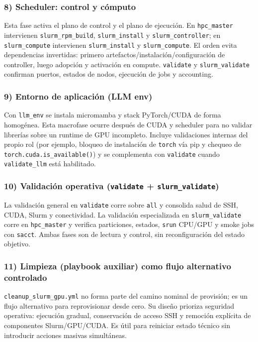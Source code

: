\subsubsection*{8) Scheduler: control y cómputo}
Esta fase activa el plano de control y el plano de ejecución. En \texttt{hpc\_master} intervienen \texttt{slurm\_rpm\_build}, \texttt{slurm\_install} y \texttt{slurm\_controller}; en \texttt{slurm\_compute} intervienen \texttt{slurm\_install} y \texttt{slurm\_compute}. El orden evita dependencias invertidas: primero artefactos/instalación/configuración de controller, luego adopción y activación en compute. \texttt{validate} y \texttt{slurm\_validate} confirman puertos, estados de nodos, ejecución de jobs y accounting.

\subsubsection*{9) Entorno de aplicación (LLM env)}
Con \texttt{llm\_env} se instala micromamba y stack PyTorch/CUDA de forma homogénea. Esta macrofase ocurre después de CUDA y scheduler para no validar librerías sobre un runtime de GPU incompleto. Incluye validaciones internas del propio rol (por ejemplo, bloqueo de instalación de \texttt{torch} vía pip y chequeo de \texttt{torch.cuda.is\_available()}) y se complementa con \texttt{validate} cuando \texttt{validate\_llm} está habilitado.

\subsubsection*{10) Validación operativa (\texttt{validate} + \texttt{slurm\_validate})}
La validación general en \texttt{validate} corre sobre \texttt{all} y consolida salud de SSH, CUDA, Slurm y conectividad. La validación especializada en \texttt{slurm\_validate} corre en \texttt{hpc\_master} y verifica particiones, estados, \texttt{srun} CPU/GPU y smoke jobs con \texttt{sacct}. Ambas fases son de lectura y control, sin reconfiguración del estado objetivo.

\subsubsection*{11) Limpieza (playbook auxiliar) como flujo alternativo controlado}
\texttt{cleanup\_slurm\_gpu.yml} no forma parte del camino nominal de provisión; es un flujo alternativo para reprovisionar desde cero. Su diseño prioriza seguridad operativa: ejecución gradual, conservación de acceso SSH y remoción explícita de componentes Slurm/GPU/CUDA. Es útil para reiniciar estado técnico sin introducir acciones masivas simultáneas.

